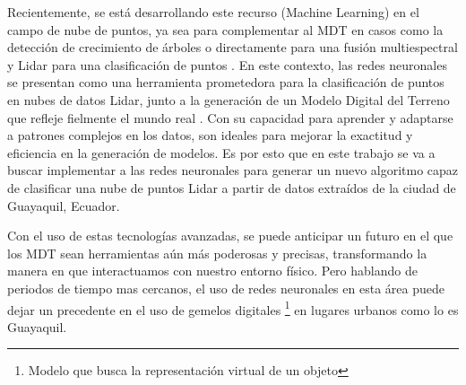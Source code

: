 Recientemente, se está desarrollando este recurso (Machine Learning) en el campo de nube de puntos, ya sea para complementar al MDT en casos como la detección de crecimiento de árboles \cite{MDT-arbol} o directamente para una fusión multiespectral y Lidar para una clasificación de puntos \cite{MTD-RF}. En este contexto, las redes neuronales se presentan como una herramienta prometedora para la clasificación de puntos en nubes de datos Lidar, junto a la generación de un Modelo Digital del Terreno que refleje fielmente el mundo real \cite{NN-Lidar}. Con su capacidad para aprender y adaptarse a patrones complejos en los datos, son ideales para mejorar la exactitud y eficiencia en la generación de modelos. Es por esto que en este trabajo se va a buscar implementar a las redes neuronales para generar un nuevo algoritmo capaz de clasificar una nube de puntos Lidar a partir de datos extraídos de la ciudad de Guayaquil, Ecuador.
\espacio

Con el uso de estas tecnologías avanzadas, se puede anticipar un futuro en el que los MDT sean herramientas aún más poderosas y precisas, transformando la manera en que interactuamos con nuestro entorno físico. Pero hablando de periodos de tiempo mas cercanos, el uso de redes neuronales en esta área puede dejar un precedente en el uso de gemelos digitales \footnote{Modelo que busca la representación virtual de un objeto} en lugares urbanos como lo es Guayaquil.

